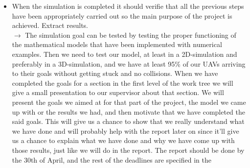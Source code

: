 \documentclass{article}
\begin{document}
\begin{itemize}
		\item When the simulation is completed it should verifie that all the previous steps have been appropriately carried out so the main purpose of the project is achieved. Extract results. \\
		$\rightarrow$ The simulation goal can be tested by testing the proper functioning of the mathematical models that have been implemented with numerical examples. Then we need to test our model, at least in a 2D-simulation and preferably in a 3D-simulation, and we have at least 95\% of our UAVs arriving to their goals without getting stuck and no collisions. 
		\vspace{2em}
		 When we have completed the goals for a section in the first level of the work tree we will give a small presentation to our supervisor about that section. We will present the goals we aimed at for that part of the project, the model we came up with or the results we had, and then motivate that we have completed the said goals. This will give us a chance to show that we really understand what we have done and will probably help with the report later on since it'll give us a chance to explain what we have done and why we have come up with those results, just like we will do in the report. The report should be done by the 30th of April, and the rest of the deadlines are specified in the 
	\end{itemize}
	\bigskip
\end{document}
